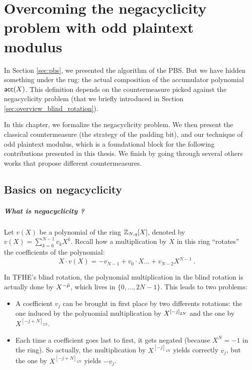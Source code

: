 
\chapter[The Negacyclicity Problem]{Overcoming the negacyclicity problem with odd plaintext modulus}
\label{chap:negacyclicity}

In Section \ref{sec:pbs}, we presented the algorithm of the PBS. But we have hidden something under the rug: the actual composition of the accumulator polynomial $\textsf{acc}(X)$. This definition depends on the countermeasure picked against the negacyclicity problem (that we briefly introduced in Section \ref{sec:overview_blind_rotation}). 


In this chapter, we formalize the negacyclicity problem. We then present the classical countermeasure (the strategy of the padding bit), and our technique of odd plaintext modulus, which is a foundational block for the following contributions presented in this thesis. We finish by going through several others works that propose different countermeasures.


\section{Basics on negacyclicity}

\paragraph{What is negacyclicity ?}

Let $v(X)$ be a polynomial of the ring $\mathbb{Z}_{N,q}[X]$, denoted by $v(X) = \sum_{k=0}^{N-1} v_k X^k$. Recall how a multiplication by $X$  in this ring ``rotates'' the coefficients of the polynomial: \[X \cdot v(X) = - v_{N - 1} + v_0 \cdot X \dots + v_{N - 2} X^{N - 1}~.\]

In TFHE's blind rotation, the polynomial multiplication in the blind rotation is actually done by $X^{-\Tilde{\mu}}$, which lives in $\{0, \dots, 2N - 1\}$. This leads to two problems:

\begin{itemize}
	\item A coefficient $v_j$ can be brought in first place by two differents rotations: the one induced by the polynomial multiplication by $X^{\left [ -j \right ]_{2N}}$ and the one by $X^{[-j + N]_{2N}}$.
	\item Each time a coefficient goes last to first, it gets negated (because $X^N = -1$ in the ring). So actually, the multiplication by $X^{[-j]_{2N}}$ yields correctly $v_j$, but the one by $X^{[-j + N]_{2N}}$ yields $-v_j$.
\end{itemize}


